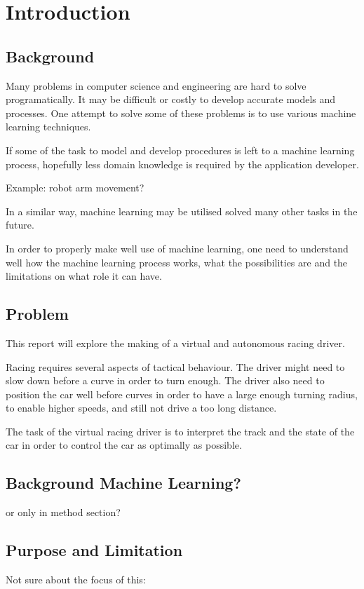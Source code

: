 \chapter{Introduction}
        
\section{Background}
Many problems in computer science and engineering are hard to solve programatically. It may be difficult or costly to develop accurate models and processes. One attempt to solve some of these problems is to use various machine learning techniques. 

If some of the task to model and develop procedures is left to a machine learning process, hopefully less domain knowledge is required by the application developer. 

Example: robot arm movement?

In a similar way, machine learning may be utilised solved many other tasks in the future.

In order to properly make well use of machine learning, one need to understand well how the machine learning process works, what the possibilities are and the limitations on what role it can have.




\section{Problem}
This report will explore the making of a virtual and autonomous racing driver. 

Racing requires several aspects of tactical behaviour. The driver might need to slow down before a curve in order to turn enough. The driver also need to position the car well before curves in order to have a large enough turning radius, to enable higher speeds, and still not drive a too long distance.

The task of the virtual racing driver is to interpret the track and the state of the car in order to control the car as optimally as possible. 




\section{Background Machine Learning?}
or only in method section?




\section{Purpose and Limitation}
Not sure about the focus of this:

